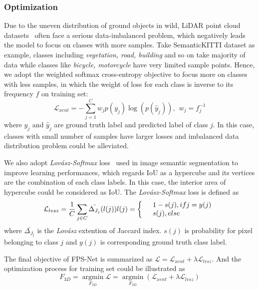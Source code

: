 \documentclass[preprint,review,3p]{elsarticle}
\begin{document}
\subsubsection{Optimization}
Due to the uneven distribution of ground objects in wild,  LiDAR point cloud datasets~\cite{behley2019semantickitti,geiger2012kitti} often face a serious data-imbalanced problem, which negatively leads the model to focus on classes with more samples. 
Take SemanticKITTI dataset \cite{behley2019semantickitti} as example, classes including \textit{vegetation, road, building} and so on take majority of data while classes like \textit{bicycle, motorcycle} have very limited sample points.
Hence, we adopt the weighted softmax cross-entropy objective to focus more on classes with less samples, in which the weight of loss for each class is inverse to its frequency $f$ on training set:
\begin{equation}
    \mathcal{L}_{xent}=-\sum^{C}_{j=1}w_jp(y_j)\log(p(\hat{y}_j)), \ \ w_j=f_j^{-1}
\end{equation}
where $y_j$ and $\hat{y}_j$ are ground truth label and predicted label of class $j$. In this case, classes with small number of samples have larger losses and imbalanced data distribution problem could be alleviated.

We also adopt \textit{Lov\'{a}sz-Softmax} loss~\cite{berman2018lovasz} used in image semantic segmentation to improve learning performances, which regards IoU as a hypercube and its vertices are the combination of each class labels. In this case, the interior area of hypercube could be considered as IoU. The \textit{Lov\'{a}sz-Softmax} loss is defined as
\begin{equation}
\mathcal{L}_{lvsz}=\frac{1}{C}\sum_{j\in C}
\bar{\Delta_{J_j}}(l(j)) \\
\space l(j)=\left \{
    \begin{array}{ll}
         & 1-s(j), if j=y(j) \\
         & s(j),  else
    \end{array}
    \right.
\end{equation}
where $\bar{\Delta_{J_j}}$ is the \textit{Lov\'{a}sz} extention of Jaccard index. $s(j)$ is probability for pixel belonging to class $j$ and $y(j)$ is corresponding ground truth class label. 

The final objective of FPS-Net is summarized as $\mathcal{L}=\mathcal{L}_{xent}+\lambda\mathcal{L}_{lvsz}$. And the optimization process for training set could be illustrated as 
\begin{equation}
  F_{3D}=\mathop{\arg\min}\limits_{F_{3D}}\mathcal{L}=\mathop{\arg\min}\limits_{F_{3D}}(\mathcal{L}_{xent}+\lambda\mathcal{L}_{lvsz})
\end{equation}
\end{document}
